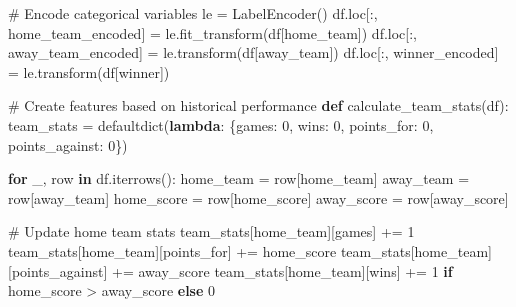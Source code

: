 \documentclass[
  letterpaper,
  DIV=11,
  numbers=noendperiod]{scrartcl}
\newenvironment{Shaded}{\begin{snugshade}}{\end{snugshade}}
\newcommand{\CommentTok}[1]{\textcolor[rgb]{0.37,0.37,0.37}{#1}}
\newcommand{\ControlFlowTok}[1]{\textcolor[rgb]{0.00,0.23,0.31}{\textbf{#1}}}
\newcommand{\DecValTok}[1]{\textcolor[rgb]{0.68,0.00,0.00}{#1}}
\newcommand{\KeywordTok}[1]{\textcolor[rgb]{0.00,0.23,0.31}{\textbf{#1}}}
\newcommand{\NormalTok}[1]{\textcolor[rgb]{0.00,0.23,0.31}{#1}}
\newcommand{\OperatorTok}[1]{\textcolor[rgb]{0.37,0.37,0.37}{#1}}
\newcommand{\StringTok}[1]{\textcolor[rgb]{0.13,0.47,0.30}{#1}}
\begin{document}
\begin{Shaded}
\begin{Highlighting}[]
\CommentTok{\# Encode categorical variables}
\NormalTok{le }\OperatorTok{=}\NormalTok{ LabelEncoder()}
\NormalTok{df.loc[:, }\StringTok{\textquotesingle{}home\_team\_encoded\textquotesingle{}}\NormalTok{] }\OperatorTok{=}\NormalTok{ le.fit\_transform(df[}\StringTok{\textquotesingle{}home\_team\textquotesingle{}}\NormalTok{])}
\NormalTok{df.loc[:, }\StringTok{\textquotesingle{}away\_team\_encoded\textquotesingle{}}\NormalTok{] }\OperatorTok{=}\NormalTok{ le.transform(df[}\StringTok{\textquotesingle{}away\_team\textquotesingle{}}\NormalTok{])}
\NormalTok{df.loc[:, }\StringTok{\textquotesingle{}winner\_encoded\textquotesingle{}}\NormalTok{] }\OperatorTok{=}\NormalTok{ le.transform(df[}\StringTok{\textquotesingle{}winner\textquotesingle{}}\NormalTok{])}

\CommentTok{\# Create features based on historical performance}
\KeywordTok{def}\NormalTok{ calculate\_team\_stats(df):}
\NormalTok{    team\_stats }\OperatorTok{=}\NormalTok{ defaultdict(}\KeywordTok{lambda}\NormalTok{: \{}\StringTok{\textquotesingle{}games\textquotesingle{}}\NormalTok{: }\DecValTok{0}\NormalTok{, }\StringTok{\textquotesingle{}wins\textquotesingle{}}\NormalTok{: }\DecValTok{0}\NormalTok{, }\StringTok{\textquotesingle{}points\_for\textquotesingle{}}\NormalTok{: }\DecValTok{0}\NormalTok{, }\StringTok{\textquotesingle{}points\_against\textquotesingle{}}\NormalTok{: }\DecValTok{0}\NormalTok{\})}
    
    \ControlFlowTok{for}\NormalTok{ \_, row }\KeywordTok{in}\NormalTok{ df.iterrows():}
\NormalTok{        home\_team }\OperatorTok{=}\NormalTok{ row[}\StringTok{\textquotesingle{}home\_team\textquotesingle{}}\NormalTok{]}
\NormalTok{        away\_team }\OperatorTok{=}\NormalTok{ row[}\StringTok{\textquotesingle{}away\_team\textquotesingle{}}\NormalTok{]}
\NormalTok{        home\_score }\OperatorTok{=}\NormalTok{ row[}\StringTok{\textquotesingle{}home\_score\textquotesingle{}}\NormalTok{]}
\NormalTok{        away\_score }\OperatorTok{=}\NormalTok{ row[}\StringTok{\textquotesingle{}away\_score\textquotesingle{}}\NormalTok{]}
        
        \CommentTok{\# Update home team stats}
\NormalTok{        team\_stats[home\_team][}\StringTok{\textquotesingle{}games\textquotesingle{}}\NormalTok{] }\OperatorTok{+=} \DecValTok{1}
\NormalTok{        team\_stats[home\_team][}\StringTok{\textquotesingle{}points\_for\textquotesingle{}}\NormalTok{] }\OperatorTok{+=}\NormalTok{ home\_score}
\NormalTok{        team\_stats[home\_team][}\StringTok{\textquotesingle{}points\_against\textquotesingle{}}\NormalTok{] }\OperatorTok{+=}\NormalTok{ away\_score}
\NormalTok{        team\_stats[home\_team][}\StringTok{\textquotesingle{}wins\textquotesingle{}}\NormalTok{] }\OperatorTok{+=} \DecValTok{1} \ControlFlowTok{if}\NormalTok{ home\_score }\OperatorTok{\textgreater{}}\NormalTok{ away\_score }\ControlFlowTok{else} \DecValTok{0}
        

\end{Highlighting}
\end{Shaded}
\end{document}
